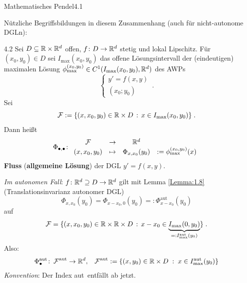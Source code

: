 \documentclass[a4paper]{article}
\begin{document}
\begin{Beispiel}{Mathematisches Pendel}{4.1}
\begin{center}
\end{center}
\end{Beispiel}

Nützliche Begriffsbildungen in diesem Zusammenhang (auch für nicht-autonome DGLn):

\begin{Def}{}{4.2}
Sei $D\subseteq \mathbb R\times\mathbb R^d$ offen, $f\colon D\to\mathbb R^d$ stetig und lokal Lipschitz. Für $(x_0,y_0)\in D$ sei $I_{\max}(x_0,y_0)$ das offene Lösungsintervall der (eindeutigen) maximalen Lösung $\phi_{\max}^{(x_0,y_0)}\in C^1(I_{\max}(x_0,y_0),\mathbb R^d)$ des AWPs  
\[\left\{ \begin{array}{c}
y'=f(x,y)\\
(x_0;y_0)
\end{array}\right.\,. \]
Sei
\[\operatorname{\mathcal{F}}:=\{(x,x_0,y_0)\in\mathbb R\times D\,:\,x\in I_{\max}(x_0,y_0)\}\;.\]
Dann heißt
\[\Phi_{\bullet,\bullet}\colon \begin{array}{clcl}
\operatorname{\mathcal{F}}&\to&\mathbb R^d&\\
(x,x_0,y_0)&\mapsto& \Phi_{x,x_0}(y_0)&:=\phi_{\max}^{(x_0,y_0)}(x)
\end{array}\]
\textbf{Fluss} (\textbf{allgemeine Lösung}) der DGL $y'=f(x,y)$.
\end{Def}

\textit{Im autonomen Fall}: $f\colon \mathbb R^d\supseteq D\to\mathbb R^d$ gilt mit Lemma \ref{Lemma:1.8} (Translationsinvarianz autonomer DGL)
\[\Phi_{x,x_0}(y_0)=\Phi_{x-x_0,0}(y_0)=:\Phi_{x-x_0}^{\text{aut}}(y_0)\]
auf
\[\operatorname{\mathcal{F}}=\{(x,x_0,y_0)\in\mathbb R\times\mathbb R\times D\,:\,x-x_0\in \underbrace{I_{\max}(0,y_0)}_{=:I_{\max}^{\text{aut}}(y_0)}\}\;.\]
Also:
\[\Phi_{\bullet}^{\text{aut}}\colon \operatorname{\mathcal{F}}^{\text{aut}}\to\mathbb R^d,\;\;\;\operatorname{\mathcal{F}}^{\text{aut}}:=\{(x,y_0)\in\mathbb R\times D\;:\;x\in I_{\max}^{\text{aut}}(y_0)\}\]
\textit{Konvention}: Der Index \glqq aut\grqq\, entfällt ab jetzt.
\end{document}
